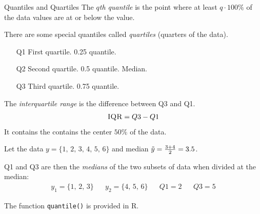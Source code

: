 \documentclass[xcolor=svgnames, 10pt]{beamer}
\begin{document}
\begin{frame}[fragile]{Quantiles and Quartiles}
The \emph{$q$th quantile} is the point where at least $q \cdot 100\%$ of the data values are at or 
below the value.

There are some special quantiles called \emph{quartiles} (quarters of the data).
\begin{enumerate}
\item[Q1] First quartile.  0.25 quantile.
\item[Q2] Second quartile.  0.5 quantile.  Median.
\item[Q3]  Third quartile.  0.75 quantile.
\end{enumerate}

The \emph{interquartile range} is the difference between Q3 and Q1.
$${\textsc{IQR}} = Q3 - Q1$$
It contains the contains the center $50\%$ of the data.
\end{frame}


\begin{frame}[fragile]
\begin{example}
Let the data $y = \{1,\,2,\,3,\,4,\,5,\,6 \}$ and median $\tilde{y} = \frac{3+4}{2} = 3.5$. 

Q1 and Q3 are then the \emph{medians} of the two subsets of data when divided at the median:
\begin{align*}
y_1 = \{1,\,2,\,3\}  && y_2 = \{4,\,5,\,6\} && Q1 = 2 && Q3 = 5
\end{align*}

The function \texttt{quantile()} is provided in R.
\end{example}
\end{frame}


\end{document}
